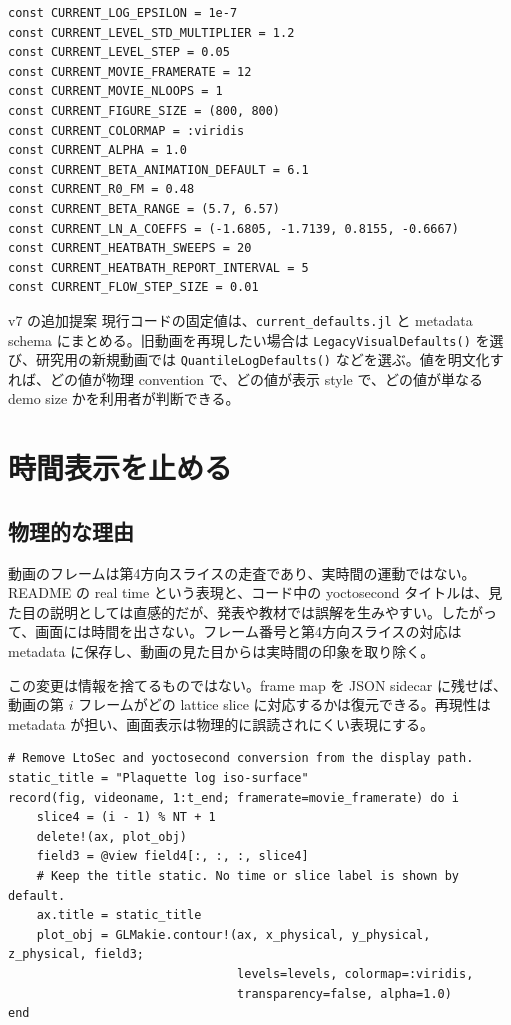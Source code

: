 \documentclass[uplatex,dvipdfmx,ja=standard,11pt,a4paper]{bxjsarticle}
\newcommand{\code}[1]{\texttt{#1}}
\begin{document}
\begin{lstlisting}[style=julia,caption={同梱 skeleton に入れた reference default の例}]
const CURRENT_LOG_EPSILON = 1e-7
const CURRENT_LEVEL_STD_MULTIPLIER = 1.2
const CURRENT_LEVEL_STEP = 0.05
const CURRENT_MOVIE_FRAMERATE = 12
const CURRENT_MOVIE_NLOOPS = 1
const CURRENT_FIGURE_SIZE = (800, 800)
const CURRENT_COLORMAP = :viridis
const CURRENT_ALPHA = 1.0
const CURRENT_BETA_ANIMATION_DEFAULT = 6.1
const CURRENT_R0_FM = 0.48
const CURRENT_BETA_RANGE = (5.7, 6.57)
const CURRENT_LN_A_COEFFS = (-1.6805, -1.7139, 0.8155, -0.6667)
const CURRENT_HEATBATH_SWEEPS = 20
const CURRENT_HEATBATH_REPORT_INTERVAL = 5
const CURRENT_FLOW_STEP_SIZE = 0.01
\end{lstlisting}

\begin{proposalbox}{v7 の追加提案}
現行コードの固定値は、\code{current\_defaults.jl} と metadata schema にまとめる。旧動画を再現したい場合は \code{LegacyVisualDefaults()} を選び、研究用の新規動画では \code{QuantileLogDefaults()} などを選ぶ。値を明文化すれば、どの値が物理 convention で、どの値が表示 style で、どの値が単なる demo size かを利用者が判断できる。
\end{proposalbox}

\section{時間表示を止める}
\subsection{物理的な理由}
動画のフレームは第4方向スライスの走査であり、実時間の運動ではない。README の real time という表現と、コード中の yoctosecond タイトルは、見た目の説明としては直感的だが、発表や教材では誤解を生みやすい\cite{VisualizingReadme,VisualizingVisualization}。したがって、画面には時間を出さない。フレーム番号と第4方向スライスの対応は metadata に保存し、動画の見た目からは実時間の印象を取り除く。

この変更は情報を捨てるものではない。frame map を JSON sidecar に残せば、動画の第 \(i\) フレームがどの lattice slice に対応するかは復元できる。再現性は metadata が担い、画面表示は物理的に誤読されにくい表現にする。

\begin{lstlisting}[style=julia,caption={時間表示を削る最小修正の骨子}]
# Remove LtoSec and yoctosecond conversion from the display path.
static_title = "Plaquette log iso-surface"
record(fig, videoname, 1:t_end; framerate=movie_framerate) do i
    slice4 = (i - 1) % NT + 1
    delete!(ax, plot_obj)
    field3 = @view field4[:, :, :, slice4]
    # Keep the title static. No time or slice label is shown by default.
    ax.title = static_title
    plot_obj = GLMakie.contour!(ax, x_physical, y_physical, z_physical, field3;
                                levels=levels, colormap=:viridis,
                                transparency=false, alpha=1.0)
end
\end{lstlisting}
\end{document}
